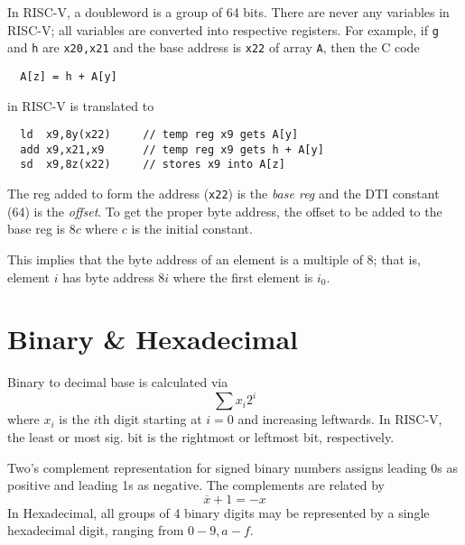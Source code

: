 \documentclass{tufte-book}
\begin{document}

\bigskip
In RISC-V, a doubleword is a group of 64 bits. There are never any variables in RISC-V; all variables are converted into respective registers. For example, if \verb|g| and \verb|h| are \verb|x20,x21| and the base address is \verb|x22| of array \verb|A|, then the C code


\begin{lstlisting}
  A[z] = h + A[y]
\end{lstlisting}
in RISC-V is translated to
\begin{lstlisting}
  ld  x9,8y(x22)     // temp reg x9 gets A[y]
  add x9,x21,x9      // temp reg x9 gets h + A[y]
  sd  x9,8z(x22)     // stores x9 into A[z]
\end{lstlisting}
The reg added to form the address (\verb|x22|) is the \textit{base reg} and the DTI constant (64) is the \textit{offset}. To get the proper byte address, the offset to be added to the base reg is $8c$ where $c$ is the initial constant.


\bigskip
This implies that the byte address of an element is a multiple of 8; that is, element $i$ has byte address $8i$ where the first element is $i_0$.

\section{Binary \& Hexadecimal}
Binary to decimal base is calculated via \begin{equation}
  \sum x_i 2^i
\end{equation}
where $x_i$ is the $i$th digit starting at $i=0$ and increasing leftwards. In RISC-V, the least or most sig. bit is the rightmost or leftmost bit, respectively.

\bigskip
Two's complement representation for signed binary numbers assigns leading 0s as positive and leading 1s as negative. The complements are related by \begin{equation}
  \overline{x} + 1 = -x
\end{equation}
In Hexadecimal, all groups of 4 binary digits may be represented by a single hexadecimal digit, ranging from $0 - 9, a - f$.
\end{document}
